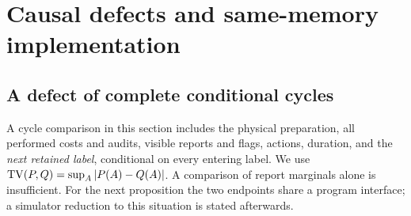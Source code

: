 \section{Causal defects and same-memory implementation}\label{sec:transfer}
\subsection{A defect of complete conditional cycles}
A cycle comparison in this section includes the physical preparation, all performed costs and audits, visible reports and flags, actions, duration, and the \emph{next retained label}, conditional on every entering label. We use $\operatorname{TV}(P,Q)=\sup_A|P(A)-Q(A)|$. A comparison of report marginals alone is insufficient. For the next proposition the two endpoints share a program interface; a simulator reduction to this situation is stated afterwards.

